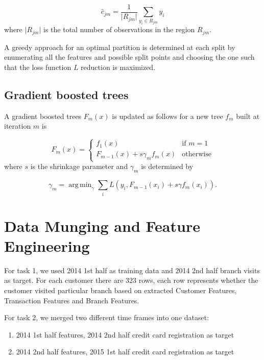 \documentclass[a4paper]{llncs}
\DeclareMathOperator*{\argmin}{arg\,min}
\begin{document}
\begin{equation}
\hat{c}_{jm} = \frac{1}{\lvert R_{jm} \lvert} \sum_{y_i \in R_{jm}} y_i
\end{equation}
where $\lvert R_{jm} \lvert$ is the total number of observations in the region $R_{jm}$.

A greedy approach for an optimal partition is determined at each split by enumerating all the features and possible split points
 and choosing the one such that the loss function $L$ reduction is maximized.

\subsection{Gradient boosted trees}
A gradient boosted trees $F_m(x)$ is updated as follows for a new tree $f_m$ built at iteration $m$ is

\begin{equation}
F_m(x) =
\begin{cases}
    f_1(x)                                 & \text{if } m = 1\\
    F_{m-1}(x) + s \gamma_m f_m(x)         & \text{otherwise}
\end{cases}
\end{equation}
where $s$ is the shrinkage parameter and $\gamma_{m}$ is determined by

\begin{equation}
\gamma_m = \argmin_\gamma \sum_{i} L(y_i, F_{m-1}(x_i) + s \gamma f_m(x_i)).
\end{equation}


\section{Data Munging and Feature Engineering}
For task 1, we used 2014 1st half as training data and 2014 2nd half branch visits as target.
 For each customer there are 323 rows, each row represents whether the customer visited particular branch based on extracted Customer Features,
 Transaction Features and Branch Features.

For task 2, we merged two different time frames into one dataset:

\begin{enumerate}
\item 2014 1st half features, 2014 2nd half credit card registration as target

\item 2014 2nd half features, 2015 1st half credit card registration as target
\end{enumerate}
\end{document}
